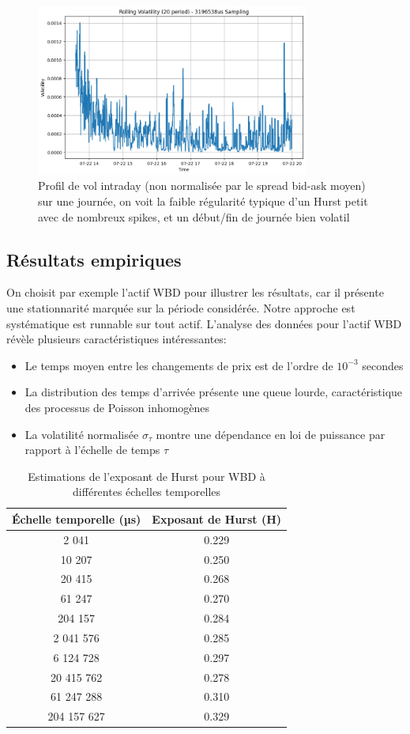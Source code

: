 \documentclass[10pt,a4paper]{article}
\theoremstyle{definition}
\theoremstyle{remark}
\begin{document}
\begin{figure}[H]
    \centering
    \includegraphics[width=0.8\textwidth]{rollingvola.png}
    \caption{Profil de vol intraday (non normalisée par le spread bid-ask moyen) sur une journée, on voit la faible régularité typique d'un Hurst petit avec de nombreux spikes, et un début/fin de journée bien volatil}
    \label{fig:jump_example_1}
\end{figure}

\subsection{Résultats empiriques}

On choisit par exemple l'actif WBD pour illustrer les résultats, car il présente une stationnarité marquée sur la période considérée. Notre approche est systématique est runnable sur tout actif.
L'analyse des données pour l'actif WBD révèle plusieurs caractéristiques intéressantes:

\begin{itemize}
    \item Le temps moyen entre les changements de prix est de l'ordre de \(10^{-3}\) secondes
    \item La distribution des temps d'arrivée présente une queue lourde, caractéristique des processus de Poisson inhomogènes
    \item La volatilité normalisée \(\sigma_{\tau}\) montre une dépendance en loi de puissance par rapport à l'échelle de temps \(\tau\)
\end{itemize}
\begin{table}[h!]
\centering
\begin{tabular}{|c|c|}
\hline
\textbf{Échelle temporelle (µs)} & \textbf{Exposant de Hurst (H)} \\
\hline
2 041 & 0.229 \\
10 207 & 0.250 \\
20 415 & 0.268 \\
61 247 & 0.270 \\
204 157 & 0.284 \\
2 041 576 & 0.285 \\
6 124 728 & 0.297 \\
20 415 762 & 0.278 \\
61 247 288 & 0.310 \\
204 157 627 & 0.329 \\
\hline
\end{tabular}
\caption{Estimations de l'exposant de Hurst pour WBD à différentes échelles temporelles}
\label{tab:hurst_exponents}
\end{table}
\end{document}
